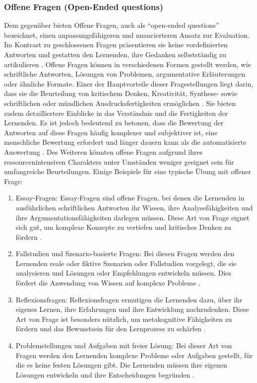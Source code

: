 \subsubsection{\gls{Offene Fragen} (Open-Ended questions)}
Dem gegenüber bieten Offene Fragen, auch als ``open-ended questions''  bezeichnet, einen anpassungsfähigeren und nuancierteren Ansatz zur Evaluation. Im Kontrast zu geschlossenen Fragen präsentieren sie keine vordefinierten Antworten und gestatten den Lernenden, ihre Gedanken selbstständig zu artikulieren \cite{review-e}. Offene Fragen können in verschiedenen Formen gestellt werden, wie schriftliche Antworten, Lösungen von Problemen, argumentative Erläuterungen oder ähnliche Formate. Einer der Hauptvorteile dieser Fragestellungen liegt darin, dass sie die Beurteilung von kritischem Denken, Kreativität, Synthese- sowie schriftlichen oder mündlichen Ausdrucksfertigkeiten ermöglichen \cite{review-e}. Sie bieten zudem detailliertere Einblicke in das Verständnis und die Fertigkeiten der Lernenden. Es ist jedoch bedeutend zu betonen, dass die Bewertung der Antworten auf diese Fragen häufig komplexer und subjektiver ist, eine menschliche Bewertung erfordert und länger dauern kann als die automatisierte Auswertung \cite{gruttmann2009formatives}. Des Weiteren könnten offene Fragen aufgrund ihres ressourcenintensiven Charakters unter Umständen weniger geeignet sein für umfangreiche Beurteilungen. Einige Beispiele für eine typische Übung mit offener Frage:

\begin{enumerate}
    \item Essay-Fragen: Essay-Fragen sind offene Fragen, bei denen die Lernenden in ausführlichen schriftlichen Antworten ihr Wissen, ihre Analysefähigkeiten und ihre Argumentationsfähigkeiten darlegen müssen. Diese Art von Frage eignet sich gut, um komplexe Konzepte zu vertiefen und kritisches Denken zu fördern \cite{gruttmann2009formatives}.

    \item Fallstudien und Szenario-basierte Fragen: Bei diesen Fragen werden den Lernenden reale oder fiktive Szenarien oder Fallstudien vorgelegt, die sie analysieren und Lösungen oder Empfehlungen entwickeln müssen. Dies fördert die Anwendung von Wissen auf komplexe Probleme \cite{gruttmann2009formatives}.

    \item Reflexionsfragen: Reflexionsfragen ermutigen die Lernenden dazu, über ihr eigenes Lernen, ihre Erfahrungen und ihre Entwicklung nachzudenken. Diese Art von Frage ist besonders nützlich, um metakognitive Fähigkeiten zu fördern und das Bewusstsein für den Lernprozess zu schärfen \cite{gruttmann2009formatives}.

    \item Problemstellungen und Aufgaben mit freier Lösung: Bei dieser Art von Fragen werden den Lernenden komplexe Probleme oder Aufgaben gestellt, für die es keine festen Lösungen gibt. Die Lernenden müssen ihre eigenen Lösungen entwickeln und ihre Entscheidungen begründen \cite{gruttmann2009formatives}.
\end{enumerate}

